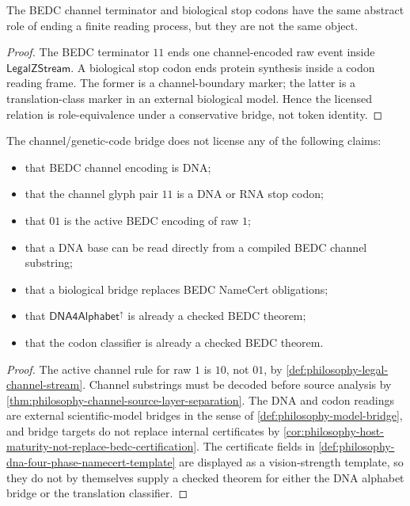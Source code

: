 \begin{theorem}
\label{thm:philosophy-stop-role-analogy-not-identity}
The BEDC channel terminator and biological stop codons have the same
abstract role of ending a finite reading process, but they are not the
same object.
\end{theorem}
\begin{proof}
The BEDC terminator $11$ ends one channel-encoded raw event inside
$\mathsf{LegalZStream}$. A biological stop codon ends protein synthesis
inside a codon reading frame. The former is a channel-boundary marker;
the latter is a translation-class marker in an external biological
model. Hence the licensed relation is role-equivalence under a
conservative bridge, not token identity.
\end{proof}

\begin{theorem}
\label{thm:philosophy-channel-genetic-cannot-claim-boundary}
The channel/genetic-code bridge does not license any of the following
claims:
\begin{itemize}
  \item that BEDC channel encoding is DNA;
  \item that the channel glyph pair $11$ is a DNA or RNA stop codon;
  \item that $01$ is the active BEDC encoding of raw $1$;
  \item that a DNA base can be read directly from a compiled BEDC
    channel substring;
  \item that a biological bridge replaces BEDC NameCert obligations;
  \item that $\mathsf{DNA4Alphabet}^{\uparrow}$ is already a checked
    BEDC theorem;
  \item that the codon classifier is already a checked BEDC theorem.
\end{itemize}
\end{theorem}
\begin{proof}
The active channel rule for raw $1$ is $10$, not $01$, by
\autoref{def:philosophy-legal-channel-stream}. Channel substrings must
be decoded before source analysis by
\autoref{thm:philosophy-channel-source-layer-separation}. The DNA and
codon readings are external scientific-model bridges in the sense of
\autoref{def:philosophy-model-bridge}, and bridge targets do not replace
internal certificates by \autoref{cor:philosophy-host-maturity-not-replace-bedc-certification}.
The certificate fields in
\autoref{def:philosophy-dna-four-phase-namecert-template} are displayed
as a vision-strength template, so they do not by themselves supply a
checked theorem for either the DNA alphabet bridge or the translation
classifier.
\end{proof}

